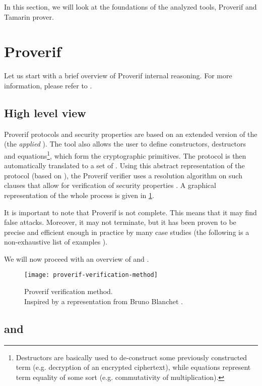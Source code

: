In this section, we will look at the foundations of the analyzed tools, Proverif and Tamarin prover.


\section{Proverif}
Let us start with a brief overview of Proverif internal reasoning. For more information, please refer to \cite{SymbolicComputationalBlanchet, SymbolicVerificationBlanchet, ProverifManual}.

\subsection{High level view}
Proverif protocols and security properties are based on an extended version of the \pic{} (the \textit{applied} \pic{}). The tool also allows the user to define constructors, destructors and equations\footnote{Destructors are basically used to de-construct some previously constructed term (e.g. decryption of an encrypted ciphertext), while equations represent term equality of some sort (e.g. commutativity of multiplication).}, which form the cryptographic primitives. The protocol is then automatically translated to a set of \Horncs{}. Using this abstract representation of the protocol (based on \Horncs{}), the Proverif verifier uses a resolution algorithm on such clauses that allow for verification of security properties \cite{SymbolicComputationalBlanchet}.
A graphical representation of the whole process is given in \cref{fig:proverif-verification-method}.

It is important to note that Proverif is not complete. This means that it may find false attacks. Moreover, it may not terminate, but it has been proven to be precise and efficient enough in practice by many case studies (the following is a non-exhaustive list of examples \cite{10.1145/1266977.1266978, ABADI20053, hal-01575923, MTProto2-Proverif}).

We will now proceed with an overview of \pic{} and \Horncs{}.

\begin{figure}[t]
  \texttt{[image: proverif-verification-method]}
  \centering
  \caption{Proverif verification method.\\Inspired by a representation from Bruno Blanchet \cite{SymbolicComputationalBlanchet}.}
  \label{fig:proverif-verification-method}
\end{figure}

\subsection{\pic{} and \apic{}}
\label{subsec:pic-apic}

